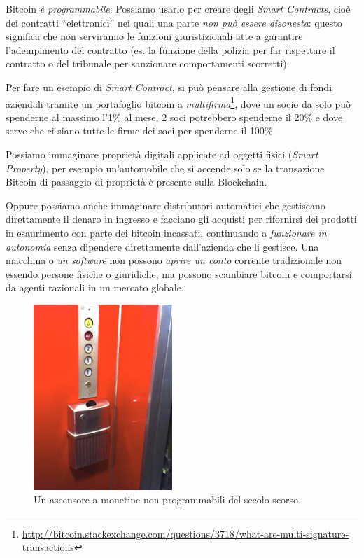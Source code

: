 \documentclass[a4paper,12pt,italian]{article}
\newcommand{\longurl}[1]{%
\href{#1}{\ttfamily \smaller #1}%
}%
\begin{document}
\bigskip

Bitcoin \emph{è programmabile}. Possiamo usarlo per creare degli \emph{Smart
Contracts}, cioè dei contratti ``elettronici'' nei quali una parte \emph{non può essere
disonesta}: questo significa che non serviranno le funzioni
giuristizionali atte a garantire l’adempimento del contratto (es. la
funzione della polizia per far rispettare il contratto o del tribunale
per sanzionare comportamenti scorretti).

\bigskip

Per fare un esempio di \emph{Smart Contract}, si può pensare alla gestione di fondi aziendali
tramite un portafoglio bitcoin a \emph{multifirma}\footnote{\longurl{http://bitcoin.stackexchange.com/questions/3718/what-are-multi-signature-transactions}}, 
dove un socio da solo può spenderne al
massimo l’1\% al mese, 2 soci potrebbero spenderne il 20\% e dove serve che ci siano
tutte le firme dei soci per spenderne il 100\%.


\bigskip

Possiamo immaginare proprietà digitali applicate ad oggetti
fisici (\emph{Smart Property}), per esempio un’automobile che si accende solo
se la transazione Bitcoin di passaggio di proprietà è presente sulla
Blockchain.


\bigskip

Oppure possiamo anche immaginare distributori automatici che gestiscano direttamente
il denaro in ingresso e facciano gli acquisti per rifornirsi dei
prodotti in esaurimento con parte dei bitcoin incassati, continuando a
\emph{funzionare in autonomia} senza dipendere direttamente dall’azienda che
li gestisce. Una macchina o \emph{un software} non possono \emph{aprire un conto}
corrente tradizionale non essendo persone fisiche o giuridiche, ma
possono scambiare bitcoin e comportarsi da agenti razionali in un
mercato globale.

\begin{figure}
\centering
\includegraphics[height=7cm]{figures/elevator.jpg}
\caption{Un ascensore a monetine non programmabili del secolo scorso.}
\end{figure}
\end{document}
